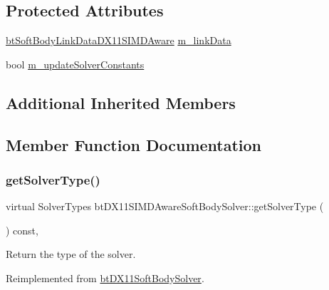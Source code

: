 \subsection*{Protected Attributes}
\begin{DoxyCompactItemize}
\item 
\hyperlink{classbtSoftBodyLinkDataDX11SIMDAware}{bt\+Soft\+Body\+Link\+Data\+D\+X11\+S\+I\+M\+D\+Aware} \hyperlink{classbtDX11SIMDAwareSoftBodySolver_a49c86a3bbaf2e70877057fa0d2059848}{m\+\_\+link\+Data}
\item 
bool \hyperlink{classbtDX11SIMDAwareSoftBodySolver_af027eb9f28bcc9069a003dd7867d0e0c}{m\+\_\+update\+Solver\+Constants}
\end{DoxyCompactItemize}
\subsection*{Additional Inherited Members}


\subsection{Member Function Documentation}
\mbox{\label{classbtDX11SIMDAwareSoftBodySolver_ad36369c7c58e1cb8ddea7ebd54612eb9}} 
\subsubsection{\texorpdfstring{get\+Solver\+Type()}{getSolverType()}\hspace{0.1cm}{\footnotesize\ttfamily [1/2]}}
{\footnotesize\ttfamily virtual Solver\+Types bt\+D\+X11\+S\+I\+M\+D\+Aware\+Soft\+Body\+Solver\+::get\+Solver\+Type (\begin{DoxyParamCaption}{ }\end{DoxyParamCaption}) const\hspace{0.3cm}{\ttfamily [inline]}, {\ttfamily [virtual]}}

Return the type of the solver. 

Reimplemented from \hyperlink{classbtDX11SoftBodySolver_a1142bb4f735d275f161f003f7d703768}{bt\+D\+X11\+Soft\+Body\+Solver}.

